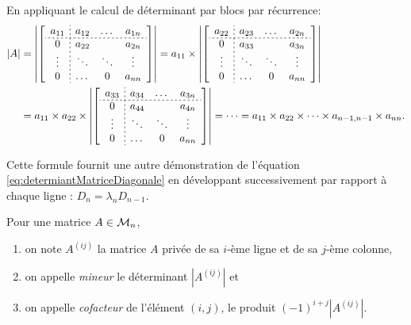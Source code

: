\proof
En appliquant le calcul de déterminant par blocs par récurrence:
\begin{align*}
  |A| 
  & = 
  \left|\left[\begin{array}{c;{2pt/2pt}ccc}
                a_{11} & a_{12} & \dots & a_{1n} \\
                \hdashline[2pt/2pt]
                0 & a_{22} &  & a_{2n} \\
                \vdots  & \ddots & \ddots & \vdots \\
                0 & \dots & 0 & a_{nn} \\
              \end{array}\right]\right| 
  = a_{11} \times 
  \left|\left[\begin{array}{c;{2pt/2pt}ccc}
                a_{22} & a_{23} & \dots & a_{2n} \\
                \hdashline[2pt/2pt]
                0 & a_{33} &  & a_{3n} \\
                \vdots & \ddots & \ddots & \vdots \\
                0 & \dots & 0 & a_{nn} \\
              \end{array}\right]\right| \\
  & = a_{11} \times a_{22} \times 
  \left|\left[\begin{array}{c;{2pt/2pt}ccc}
                a_{33} & a_{34} & \dots & a_{3n} \\
                \hdashline[2pt/2pt]
                0 & a_{44} &  & a_{4n} \\
                \vdots  & \ddots & \ddots & \vdots \\
                0 & \dots & 0 & a_{nn} \\
              \end{array}\right]\right| 
  = \dots = a_{11} \times a_{22} \times \dots \times a_{n-1, n-1} \times a_{nn}.
\end{align*}
\eproof

\remark Cette formule fournit une autre démonstration de l'équation \eqref{eq:determiantMatriceDiagonale} en développant successivement par rapport à chaque ligne : $D_n = \lambda_n D_{n-1}$.

\begin{definition} \label{def:mineurCofacteur}
  Pour une matrice $A \in \mathcal{M}_n$, 
  \begin{enumerate}[\itemdot]
   \item on note $A^{(ij)}$ la matrice $A$ privée de sa $i$-ème ligne et de sa $j$-ème colonne,
   \item on appelle {\em mineur} le déterminant $|A^{(ij)}|$ et
   \item on appelle {\em cofacteur} de l'élément $(i, j)$, le produit $(-1)^{i+j} |A^{(ij)}|$.
  \end{enumerate}
\end{definition}

